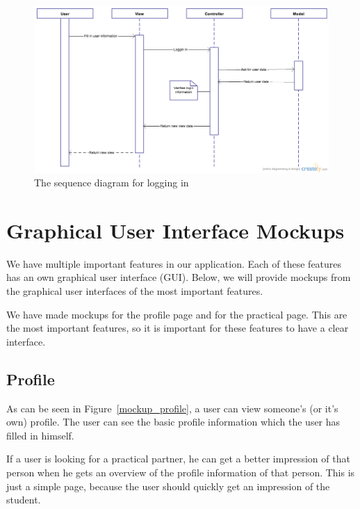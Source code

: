 \begin{figure}[H]
    \centering
    \captionsetup{justification=centering}
    \includegraphics[width=\textwidth, frame]{images/sequence_login}
    \caption{The sequence diagram for logging in}
    \label{sequence_login}
\end{figure}

\section{Graphical User Interface Mockups}
We have multiple important features in our application.
Each of these features has an own graphical user interface (GUI).
Below, we will provide mockups from the graphical user interfaces of the most important features.

We have made mockups for the profile page and for the practical page.
This are the most important features, so it is important for these features to have a clear interface.

\subsection{Profile}
As can be seen in Figure~\ref{mockup_profile}, a user can view someone's (or it's own) profile.
The user can see the basic profile information which the user has filled in himself.

If a user is looking for a practical partner, he can get a better impression of that person when he gets an overview of the profile information of that person.
This is just a simple page, because the user should quickly get an impression of the student.\\

